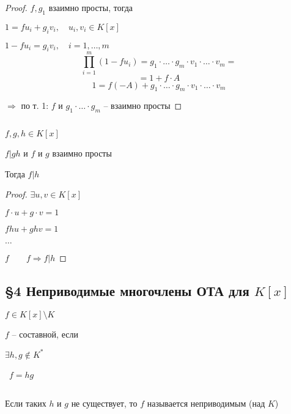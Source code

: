     \begin{proof}
        $f, g_1$ взаимно просты, тогда
        \par $1 = f u_i + g_i v_i, \quad u_i, v_i \in K[x]$
        \par $1 - f u_i = g_i v_i, \quad i = 1, \dots, m$
        \[
            \prod_{i=1}^m (1 - f u_i) = g_1 \cdot \ldots \cdot g_m \cdot v_1 \cdot \ldots \cdot v_m =
        \]
        \[
            = 1 + f \cdot A %
        \]
        \[
            1 = f (-A) + g_1 \cdot \ldots \cdot g_m \cdot v_1 \cdot \ldots \cdot v_m
        \]
        \par $\Rightarrow$ по т. 1: $f$ и $g_1 \cdot \ldots \cdot g_m$ -- взаимно просты
    \end{proof}

    \begin{theorem}
        $ $
        \par \quad $f, g, h \in K[x]$
        \par \quad $f | gh$ и $f$ и $g$ взаимно просты
        \par \quad Тогда $f | h$
    \end{theorem}

    \begin{proof}
        $\exists u, v \in K[x]$
        \par \quad $f \cdot u + g \cdot v = 1$
        \par \quad $fhu + ghv = 1$
        \par \quad $\dots$
        \par \quad $f \quad \quad f \Rightarrow f | h$  %
    \end{proof}

    \subsection*{\S4 Неприводимые многочлены ОТА для $K[x]$}

    \begin{definition}
        $f \in K[x] \setminus K$
        \par \quad $f$ -- составной, если
        \par \quad $\exists h, g \not \in K^*$
        \par \quad \ $f = hg$
        \par $ $
        \par \quad Если таких $h$ и $g$ не существует, то $f$ называется неприводимым (над $K$)
    \end{definition}

